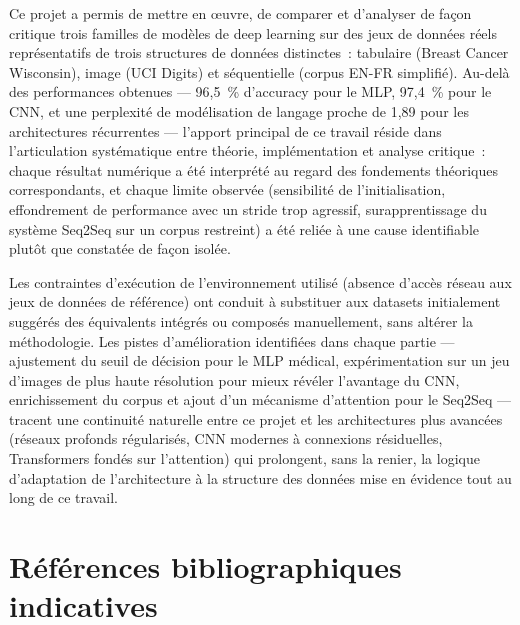 \documentclass[11pt,a4paper]{article}
\begin{document}
Ce projet a permis de mettre en œuvre, de comparer et d'analyser de façon critique trois familles de modèles de deep learning sur des jeux de données réels représentatifs de trois structures de données distinctes~: tabulaire (Breast Cancer Wisconsin), image (UCI Digits) et séquentielle (corpus EN-FR simplifié). Au-delà des performances obtenues --- 96,5~\% d'accuracy pour le MLP, 97,4~\% pour le CNN, et une perplexité de modélisation de langage proche de 1,89 pour les architectures récurrentes --- l'apport principal de ce travail réside dans l'articulation systématique entre théorie, implémentation et analyse critique~: chaque résultat numérique a été interprété au regard des fondements théoriques correspondants, et chaque limite observée (sensibilité de l'initialisation, effondrement de performance avec un stride trop agressif, surapprentissage du système Seq2Seq sur un corpus restreint) a été reliée à une cause identifiable plutôt que constatée de façon isolée.

Les contraintes d'exécution de l'environnement utilisé (absence d'accès réseau aux jeux de données de référence) ont conduit à substituer aux datasets initialement suggérés des équivalents intégrés ou composés manuellement, sans altérer la méthodologie. Les pistes d'amélioration identifiées dans chaque partie --- ajustement du seuil de décision pour le MLP médical, expérimentation sur un jeu d'images de plus haute résolution pour mieux révéler l'avantage du CNN, enrichissement du corpus et ajout d'un mécanisme d'attention pour le Seq2Seq --- tracent une continuité naturelle entre ce projet et les architectures plus avancées (réseaux profonds régularisés, CNN modernes à connexions résiduelles, Transformers fondés sur l'attention) qui prolongent, sans la renier, la logique d'adaptation de l'architecture à la structure des données mise en évidence tout au long de ce travail.

\newpage
\section*{Références bibliographiques indicatives}
\end{document}
